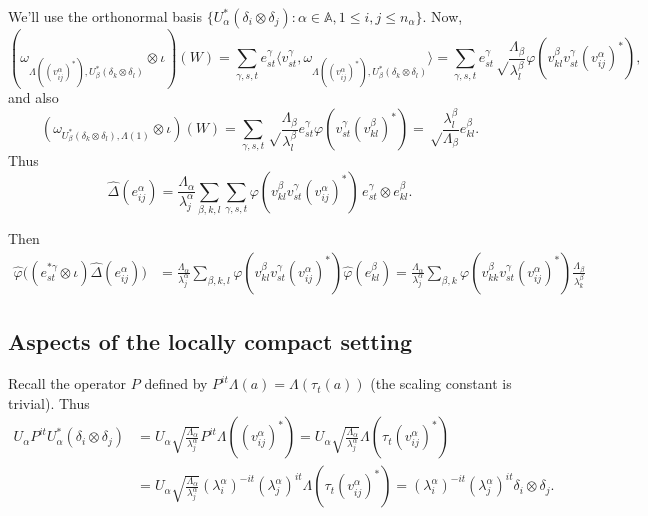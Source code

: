 \documentclass[twoside,a4paper,12pt]{article}
\theoremstyle{plain}
\theoremstyle{definition}
\newcommand{\ip}[2]{\langle #1,#2 \rangle}
\begin{document}
We'll use the orthonormal basis $\{ U_\alpha^*(\delta_i\otimes\delta_j)
: \alpha\in\mathbb A, 1\leq i,j\leq n_\alpha \}$.  Now,
\[ ( \omega_{ \Lambda((v^\alpha_{ij})^*),
U_\beta^*(\delta_k\otimes\delta_l) } \otimes\iota)(W)
= \sum_{\gamma,s,t} e^\gamma_{st} \ip{v^\gamma_{st}}
{\omega_{ \Lambda((v^\alpha_{ij})^*),
U_\beta^*(\delta_k\otimes\delta_l) }}
= \sum_{\gamma,s,t} e^\gamma_{st}
\sqrt\frac{\Lambda_\beta}{\lambda^\beta_l}
\varphi( v^\beta_{kl} v^\gamma_{st} (v^\alpha_{ij})^* ), \]
and also
\[ ( \omega_{ U_\beta^*(\delta_k\otimes\delta_l) ,
\Lambda(1) } \otimes\iota)(W)
= \sum_{\gamma,s,t} \sqrt\frac{\Lambda_\beta}{\lambda^\beta_l}
e^\gamma_{st} \varphi( v^\gamma_{st}(v^\beta_{kl})^* )
= \sqrt\frac{\lambda^\beta_l}{\Lambda_\beta} e^\beta_{kl}. \]
Thus
\[ \hat\Delta( e^\alpha_{ij} )
= \frac{\Lambda_\alpha}{\lambda^\alpha_j}
\sum_{\beta,k,l} \sum_{\gamma,s,t}
\varphi( v^\beta_{kl} v^\gamma_{st} (v^\alpha_{ij})^* ) \,
e^\gamma_{st} \otimes e^\beta_{kl}. \]

Then
\begin{align*}
\hat\varphi\big( (e^{*\gamma}_{st}\otimes\iota)\hat\Delta(e^\alpha_{ij}) \big)
&= \frac{\Lambda_\alpha}{\lambda^\alpha_j}
\sum_{\beta,k,l} \varphi( v^\beta_{kl} v^\gamma_{st} (v^\alpha_{ij})^* )
\hat\varphi(e^\beta_{kl})
= \frac{\Lambda_\alpha}{\lambda^\alpha_j}
\sum_{\beta,k} \varphi( v^\beta_{kk} v^\gamma_{st} (v^\alpha_{ij})^* )
\frac{\Lambda_\beta}{\lambda^\beta_k}
\end{align*}



\subsection{Aspects of the locally compact setting}

Recall the operator $P$ defined by $P^{it}\Lambda(a) = \Lambda(\tau_t(a))$
(the scaling constant is trivial).  Thus
\begin{align*} U_\alpha P^{it} U_\alpha^*(\delta_i\otimes\delta_j) &=
U_\alpha \sqrt{\frac{\Lambda_\alpha}{\lambda^\alpha_j}}
   P^{it} \Lambda((v^\alpha_{ij})^*)
= U_\alpha \sqrt{\frac{\Lambda_\alpha}{\lambda^\alpha_j}}
   \Lambda(\tau_t(v^\alpha_{ij})^*) \\
&= U_\alpha \sqrt{\frac{\Lambda_\alpha}{\lambda^\alpha_j}}
   (\lambda^\alpha_i)^{-it} (\lambda^\alpha_j)^{it} 
   \Lambda(\tau_t(v^\alpha_{ij})^*)
= (\lambda^\alpha_i)^{-it} (\lambda^\alpha_j)^{it} \delta_i\otimes\delta_j.
\end{align*}
\end{document}
